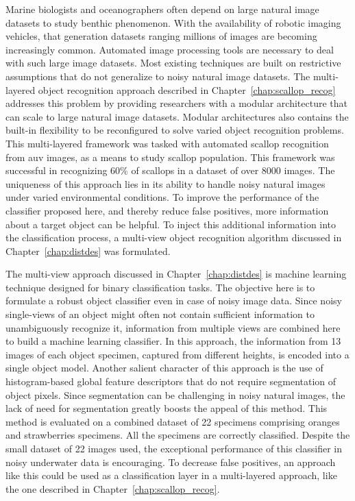 Marine biologists and oceanographers often depend on large natural image datasets to study benthic phenomenon. With the availability of robotic imaging vehicles, that generation datasets ranging millions of images are becoming increasingly common. Automated image processing tools are necessary to deal with such large image datasets. Most existing techniques are built on restrictive assumptions that do not generalize to noisy natural image datasets. The multi-layered object recognition approach described in Chapter~\ref{chap:scallop_recog} addresses this problem by providing researchers with a modular architecture that can scale to large natural image datasets. Modular architectures also contains the built-in flexibility to be reconfigured to solve varied object recognition problems.
This multi-layered framework was tasked with automated scallop recognition from \gls{auv} images, as a means to study scallop population. 
This framework was successful in recognizing 60\% of scallops in a dataset of over 8000 images.
The uniqueness of this approach lies in its ability to handle noisy natural images under varied environmental conditions.
To improve the performance of the classifier proposed here, and thereby reduce false positives, more information about a target object can be helpful.
To inject this additional information into the classification process, a multi-view object recognition algorithm discussed in Chapter~\ref{chap:distdes} was formulated.

The multi-view approach discussed in Chapter~\ref{chap:distdes} is machine learning 
technique designed for binary classification tasks. 
The objective here is to formulate a robust object classifier even in case of noisy image data.
Since noisy single-views of an object might often not contain sufficient information to unambiguously recognize it, information from multiple views are combined 
here to build a machine learning classifier. 
In this approach, the information from 13 images of each object specimen, captured from different heights, is encoded into a single object model.
Another salient character of this approach is the use of histogram-based global feature descriptors that do not
require segmentation of object pixels. Since segmentation can be challenging in noisy natural images, the lack of need for segmentation greatly boosts the appeal of this method. This method is evaluated on a combined dataset of 22 specimens comprising oranges and strawberries specimens.
All the specimens are correctly classified. Despite the small dataset of 22 images used, the exceptional performance of this classifier in noisy underwater data is encouraging. To decrease false positives, an approach like this could be used as a classification layer in a multi-layered approach, like the one described in Chapter~\ref{chap:scallop_recog}.

